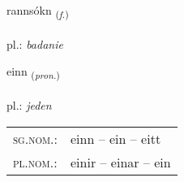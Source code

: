 \documentclass[frontgrid, backgrid]{flacards}\usepackage[]{graphicx}\usepackage[]{xcolor}
\begin{document}
\renewcommand{\blhead}{\vskip5pt {\small\bfseries\footnotesize Nafnorð | rzeczownik }}
\renewcommand{\bcfoot}{\vskip5pt \hspace{2pt}{\small\bfseries\footnotesize 1K}}


{rannsókn \small{\textsubscript{(\textit{f.})}} \\[1ex] %
\textphonetic{[ransouhkn̥]} \\
pl.: \emph{badanie} \\  [2ex]
\renewcommand*{\arraystretch}{0.8}
}

\renewcommand{\flhead}{\vskip5pt \fboxsep=0pt {\small\bfseries\footnotesize Fornafn | zaimek}}
\renewcommand{\fcfoot}{\vskip5pt \fboxsep=0pt \hspace{2pt}{\small\bfseries\footnotesize 1K}}

\renewcommand{\blhead}{\vskip5pt {\small\bfseries\footnotesize Fornafn | zaimek }}
\renewcommand{\bcfoot}{\vskip5pt \hspace{2pt}{\small\bfseries\footnotesize 1K}}


{einn \small{\textsubscript{(\textit{pron.})}} \\[1ex] %
\textphonetic{[eitn̥]} \\
pl.: \emph{jeden} \\  [2ex]
\renewcommand*{\arraystretch}{0.8}
\begin{tabular}{ll}
\textsc{sg.nom.}: & einn  --  ein -- eitt \\ 
\textsc{pl.nom.}: & einir -- einar -- ein
\end{tabular}
}

\renewcommand{\flhead}{\vskip5pt \fboxsep=0pt {\small\bfseries\footnotesize Lýsingarorð | przymiotnik}}
\renewcommand{\fcfoot}{\vskip5pt \fboxsep=0pt \hspace{2pt}{\small\bfseries\footnotesize 1K}}
\end{document}
